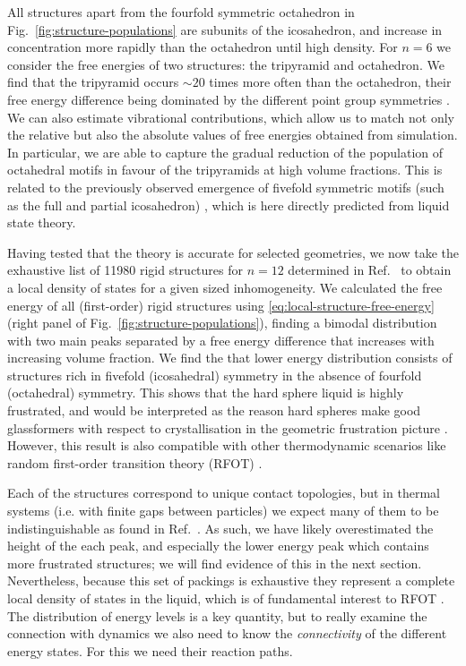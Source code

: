 \documentclass[11pt,twoside]{report}
\begin{document}
All structures apart from the fourfold symmetric octahedron in Fig.\ \ref{fig:structure-populations} are subunits of the icosahedron, and increase in concentration more rapidly than the octahedron until high density.
For $n=6$ we consider the free energies of two structures: the tripyramid and octahedron.
We find that the tripyramid occurs $\sim20$ times more often than the octahedron, their free energy difference being dominated by the different point group symmetries \cite{MalinsJPCM2009,MengS2010,CatesSM2015}.
We can also estimate vibrational contributions, which allow us to match not only the relative but also the absolute values of free energies obtained from simulation.
In particular, we are able to capture the gradual reduction of the population of octahedral motifs in favour of the tripyramids at high volume fractions.
This is related to the previously observed emergence of fivefold symmetric motifs (such as the full and partial icosahedron) \cite{RoyallPR2015,TarjusJPCM2005,HallettNC2018,DunleavyNC2015}, which is here directly predicted from liquid state theory.

Having tested that the theory is accurate for selected geometries, we now take the exhaustive list of 11980 rigid structures for $n=12$ determined in Ref.\ \cite{Holmes-CerfonSR2016} to obtain a local density of states for a given sized inhomogeneity.
We calculated the free energy of all (first-order) rigid structures using \eqref{eq:local-structure-free-energy} (right panel of Fig.\ \ref{fig:structure-populations}), finding a bimodal distribution with two main peaks separated by a free energy difference that increases with increasing volume fraction.
We find the that lower energy distribution consists of structures rich in fivefold (icosahedral) symmetry in the absence of fourfold (octahedral) symmetry.
This shows that the hard sphere liquid is highly frustrated, and would be interpreted as the reason hard spheres make good glassformers with respect to crystallisation in the geometric frustration picture \cite{FrankPRS1952}.
However, this result is also compatible with other thermodynamic scenarios like random first-order transition theory (RFOT) \cite{LubchenkoARPC2007}.

Each of the structures correspond to unique contact topologies, but in thermal systems (i.e. with finite gaps between particles) we expect many of them to be indistinguishable as found in Ref.\ \cite{TrombachPRE2018}.
As such, we have likely overestimated the height of the each peak, and especially the lower energy peak which contains more frustrated structures; we will find evidence of this in the next section.
Nevertheless, because this set of packings is exhaustive they represent a complete local density of states in the liquid, which is of fundamental interest to RFOT \cite{LubchenkoARPC2007}.
The distribution of energy levels is a key quantity, but to really examine the connection with dynamics we also need to know the \emph{connectivity} of the different energy states.
For this we need their reaction paths.
\end{document}
